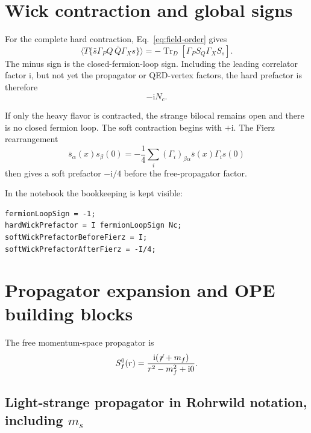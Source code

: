 \documentclass[11pt]{article}
\newcommand{\ii}{\mathrm{i}}
\newcommand{\Tr}{\operatorname{Tr}}
\begin{document}
\section{Wick contraction and global signs}

For the complete hard contraction, Eq.~\eqref{eq:field-order} gives
\begin{equation}
  \langle T\{\bar s\Gamma_PQ\,\bar Q\Gamma_Xs\}\rangle
  =-\Tr_D[\Gamma_PS_Q\Gamma_XS_s].
\end{equation}
The minus sign is the closed-fermion-loop sign.  Including the leading
correlator factor $\ii$, but not yet the propagator or QED-vertex factors, the
hard prefactor is therefore
\begin{equation}
  -\ii N_c.
\end{equation}

If only the heavy flavor is contracted, the strange bilocal remains open and
there is no closed fermion loop.  The soft contraction begins with $+\ii$.
The Fierz rearrangement
\begin{equation}
  \bar s_\alpha(x)s_\beta(0)
  =-\frac14\sum_i(\Gamma_i)_{\beta\alpha}
  \bar s(x)\Gamma_i s(0)
\end{equation}
then gives a soft prefactor $-\ii/4$ before the free-propagator factor.

In the notebook the bookkeeping is kept visible:
\begin{lstlisting}
fermionLoopSign = -1;
hardWickPrefactor = I fermionLoopSign Nc;
softWickPrefactorBeforeFierz = I;
softWickPrefactorAfterFierz = -I/4;
\end{lstlisting}

\section{Propagator expansion and OPE building blocks}

The free momentum-space propagator is
\begin{equation}
  S_f^0(r)=\frac{\ii(\not\!r+m_f)}{r^2-m_f^2+\ii0}.
  \label{eq:free-propagator}
\end{equation}

\subsection{Light-strange propagator in Rohrwild notation, including $m_s$}
\end{document}
